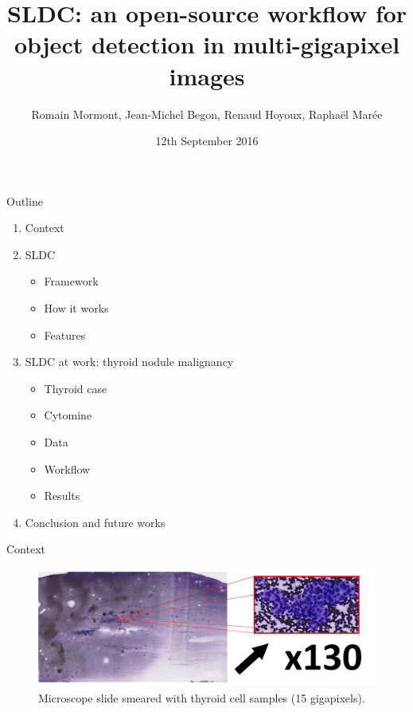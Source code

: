 \documentclass{beamer}
\title{{\bf SLDC: an open-source workflow for object detection in multi-gigapixel images}}
\author{Romain Mormont, Jean-Michel Begon, Renaud Hoyoux, Raphaël Marée}
\institute{Montefiore Institute, University of Liège, Belgium}
\date{12th September 2016}
\begin{document}
\renewcommand{\inserttotalframenumber}{20}


\begin{frame}
\titlepage
\end{frame}

\begin{frame}{Outline}

	\begin{enumerate}

		\item Context
		
		\item SLDC
		\begin{itemize}
			\item Framework
			\item How it works
			\item Features
		\end{itemize}

		\item SLDC at work: thyroid nodule malignancy
		\begin{itemize}
			\item Thyroid case
			\item Cytomine
			\item Data
			\item Workflow
			\item Results
		\end{itemize}
		
		\item Conclusion and future works
		
	\end{enumerate}

\end{frame}


\begin{frame}{Context}
	\vfill
	\begin{figure}[h]
	\center
	\includegraphics[scale=0.19]{images/whole-slide-dim.png}
	\caption{Microscope slide smeared with thyroid cell samples (15 gigapixels).}
	\end{figure}
	\vfill
\end{frame}
\end{document}
